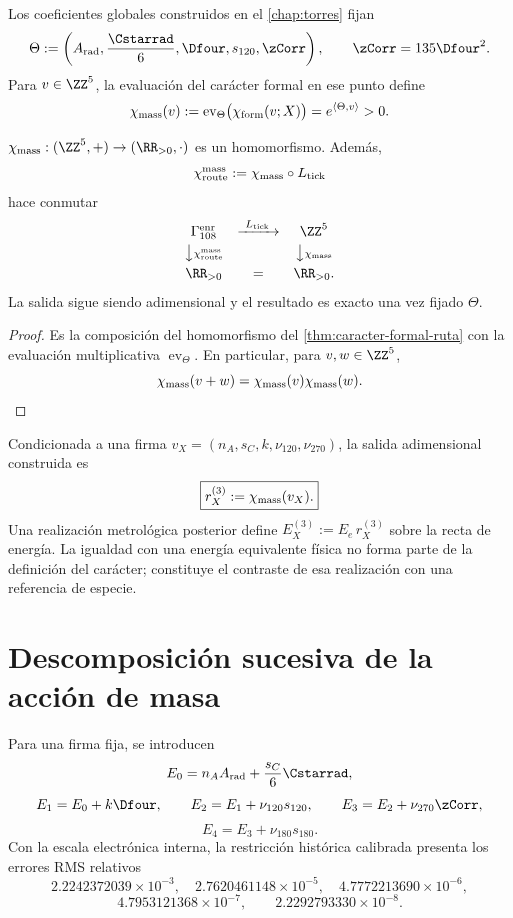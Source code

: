 Los coeficientes globales construidos en el \cref{chap:torres} fijan
\[
 \Theta:=\left(A_{\rm rad},\frac{\Cstarrad}{6},
 \Dfour,s_{120},\zCorr\right),
 \qquad \zCorr=135\Dfour^2.
\]
Para \(v\in\ZZ^5\), la evaluación del carácter formal en ese punto define
\[
 \chi_{\rm mass}(v)
 :=\operatorname{ev}_{\Theta}\bigl(\chi_{\rm form}(v;X)\bigr)
 =e^{\langle\Theta,v\rangle}>0.
\]

\begin{corollary}
\label{cor:especializacion-caracter-masa}
\(\chi_{\rm mass}:(\ZZ^5,+)\to(\RR_{>0},\cdot)\) es un homomorfismo. Además,
\[
\chi_{\rm route}^{\rm mass}
:=\chi_{\rm mass}\circ L_{\rm tick}
\]
hace conmutar
\[
 \begin{array}{ccc}
 \Gamma_{108}^{\rm enr}&\xrightarrow{\ L_{\rm tick}\ }&\ZZ^5\\[1mm]
 \big\downarrow{\scriptstyle\chi_{\rm route}^{\rm mass}}&&
 \big\downarrow{\scriptstyle\chi_{\rm mass}}\\[1mm]
 \RR_{>0}&=&\RR_{>0}.
 \end{array}
\]
La salida sigue siendo adimensional y el resultado es exacto una vez fijado
\(\Theta\).
\end{corollary}
\begin{proof}
Es la composición del homomorfismo del
\cref{thm:caracter-formal-ruta} con la evaluación multiplicativa
\(\operatorname{ev}_{\Theta}\). En particular, para \(v,w\in\ZZ^5\),
\[
 \chi_{\rm mass}(v+w)=\chi_{\rm mass}(v)\chi_{\rm mass}(w).
\]
\end{proof}

Condicionada a una firma
\(v_X=(n_A,s_C,k,\nu_{120},\nu_{270})\), la salida adimensional construida es
\[
 \boxed{r_X^{(3)}:=\chi_{\rm mass}(v_X).}
\]
Una realización metrológica posterior define
\(E_X^{(3)}:=E_e\,r_X^{(3)}\) sobre la recta de energía. La igualdad con una
energía equivalente física no forma parte de la definición del carácter;
constituye el contraste de esa realización con una referencia de especie.

\section{Descomposición sucesiva de la acción de masa}

Para una firma fija, se introducen
\[
 E_0=n_AA_{\rm rad}+\frac{s_C}{6}\Cstarrad,
\]
\[
 E_1=E_0+k\Dfour,
 \qquad E_2=E_1+\nu_{120}s_{120},
 \qquad E_3=E_2+\nu_{270}\zCorr,
\]
\[
 \boxed{E_4=E_3+\nu_{180}s_{180}.}
\]
Con la escala electrónica interna, la restricción histórica calibrada
presenta los errores RMS relativos
\[
 2.2242372039\times10^{-3},\quad
 2.7620461148\times10^{-5},\quad
 4.7772213690\times10^{-6},
\]
\[
 4.7953121368\times10^{-7},\qquad
 \boxed{2.2292793330\times10^{-8}}.
\]

